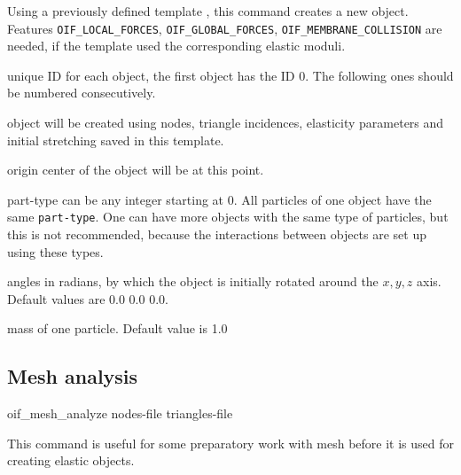 Using a previously defined template , this command creates a new object. Features \verb|OIF_LOCAL_FORCES|, \verb|OIF_GLOBAL_FORCES|, \verb|OIF_MEMBRANE_COLLISION| are needed, if the template used the corresponding elastic moduli.

\begin{arguments}
\item[\var{oid}] unique ID for each object, the first object has the ID 0. The following ones should be numbered consecutively.
\item[\var{tid}] object will be created using nodes, triangle incidences, elasticity parameters and initial stretching saved in this template.
\item[origin \var{x} \var{y} \var{z}] center of the object will be at this point.
\item[part-type \var{type}] can be any integer starting at 0. All particles of one object have the same \verb|part-type|. One can have more objects with the same type of particles, but this is not recommended, because the interactions between objects are set up using these types.
\item[\opt{rotate \var{x} \var{y} \var{z}}] angles in radians, by which the object is initially rotated around the $x, y, z$ axis. Default values are 0.0 0.0 0.0.
\item[\opt{mass \var{m}}] mass of one particle. Default value is 1.0
\end{arguments}

\subsection{\label{ssec:oif-mesh-analyze}Mesh analysis}

\begin{essyntax}
  oif_mesh_analyze
  nodes-file  
  triangles-file  
\end{essyntax}

This command is useful for some preparatory work with mesh before it is used for creating elastic objects.

